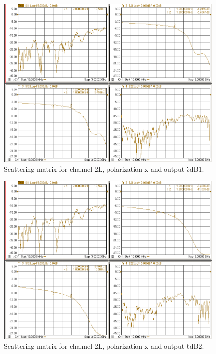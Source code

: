\documentclass[12pt,a4paper,oneside]{article}
\begin{document}
\begin{figure}[H]
\centering
\includegraphics[width=0.9\linewidth]{VNA_results/2Lx_3dB1.png}
\caption{Scattering matrix for channel 2L, polarization x and output 3dB1.}
\label{fig:2Lx_3dB1}
\end{figure}


\begin{figure}[H]
\centering
\includegraphics[width=0.9\linewidth]{VNA_results/2Lx_6dB2.png}
\caption{Scattering matrix for channel 2L, polarization x and output 6dB2.}
\label{fig:2Lx_6dB2}
\end{figure}
\end{document}
